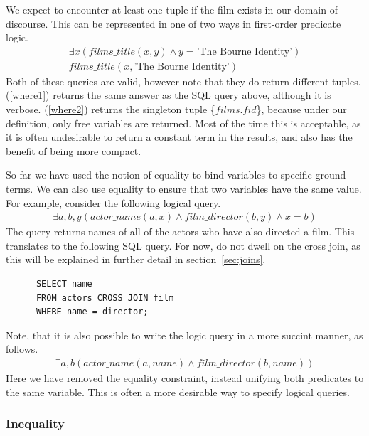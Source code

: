 \documentclass[a4paper, 11pt]{article}
\begin{document}
      We expect to encounter at least one tuple if the film exists in our domain
      of discourse.  This can be represented
      in one of two ways in first-order predicate logic.
      \begin{gather}
        \exists x(films\_title(x, y) \land y = \text{'The Bourne
        Identity'})\label{where1}\\
        films\_title(x, \text{'The Bourne Identity'})\label{where2}
      \end{gather}
      Both of these queries are valid, however note that they do return different
      tuples. (\ref{where1}) returns the same answer as the SQL query above, although
      it is verbose. (\ref{where2}) returns the singleton tuple \{$films.fid$\},
      because under our definition, only free variables are returned. Most of
      the time this is acceptable, as it is often undesirable to return a
      constant term in the results, and also has the benefit of being more
      compact.

      So far we have used the notion of equality to bind variables to specific
      ground terms. We can also use equality to ensure that two variables have
      the same value. For example, consider the following logical query.
      \begin{gather}
        \exists a,b,y(actor\_name(a, x) \land film\_director(b, y) \land x = b)
      \end{gather}
      The query returns names of all of the actors who have also directed a
      film. This translates to the following SQL query. For now, do not dwell
      on the cross join, as this will be explained in further detail in
      section~\ref{sec:joins}.

      \begin{verbatim}
      SELECT name
      FROM actors CROSS JOIN film
      WHERE name = director;
      \end{verbatim}

      Note, that it is also possible to write the logic query in a more succint
      manner, as follows.
      \begin{gather}
        \exists a,b(actor\_name(a, name) \land film\_director(b, name))
      \end{gather}
      Here we have removed the equality constraint, instead unifying both
      predicates to the same variable. This is often a more desirable way to
      specify logical queries.

    \subsubsection{Inequality}
\end{document}
